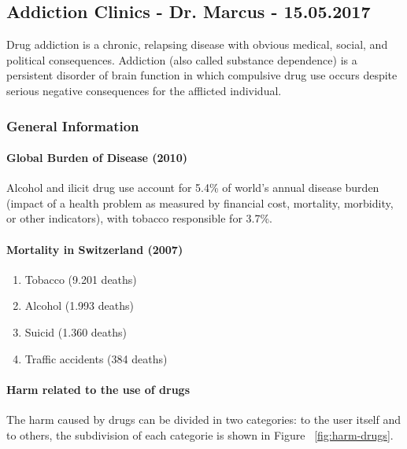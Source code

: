 \documentclass[12pt,article,oneside,a4paper]{memoir}
\begin{document}
\newpage
\subsection{Addiction Clinics - Dr. Marcus - 15.05.2017}

Drug addiction is a chronic, relapsing disease with obvious medical, social, and political consequences. Addiction (also called substance dependence) is a persistent disorder of brain function in which compulsive drug use occurs despite serious negative consequences for the afflicted individual.

\subsubsection{General Information}
\paragraph{Global Burden of Disease (2010)} Alcohol and ilicit drug use account for 5.4\% of world's annual disease burden (impact of a health problem as measured by financial cost, mortality, morbidity, or other indicators), with tobacco responsible for 3.7\%.

\paragraph{Mortality in Switzerland (2007)} 
\begin{enumerate}
\item Tobacco (9.201 deaths)
\item Alcohol (1.993 deaths)
\item Suicid (1.360 deaths)
\item Traffic accidents (384 deaths)
\end{enumerate}

\paragraph{Harm related to the use of drugs}
The harm caused by drugs can be divided in two categories: to the user itself and to others, the subdivision of each categorie is shown in Figure ~\ref{fig:harm-drugs}.
\end{document}
